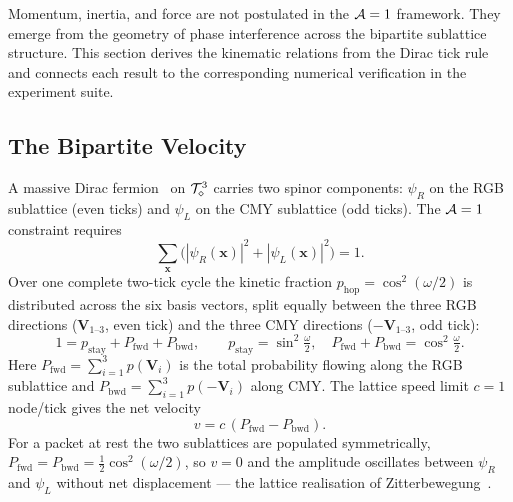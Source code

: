 \label{sec:kinematics}

Momentum, inertia, and force are not postulated in the $\mathcal{A}=1$ framework.
They emerge from the geometry of phase interference across the bipartite
sublattice structure.  This section derives the kinematic relations
from the Dirac tick rule and connects each result to the corresponding
numerical verification in the experiment suite.

\subsection{The Bipartite Velocity}
\label{subsec:bipartite_velocity}

A massive Dirac fermion~\cite{dirac1928} on $\mathcal{T}_\diamond^3$ carries two spinor components:
$\psi_R$ on the RGB sublattice (even ticks) and $\psi_L$ on the CMY
sublattice (odd ticks).  The $\mathcal{A}=1$ constraint requires
\begin{equation}
    \sum_{\mathbf{x}} \bigl(|\psi_R(\mathbf{x})|^2 +
                            |\psi_L(\mathbf{x})|^2\bigr) = 1.
    \label{eq:unity_spinor}
\end{equation}
Over one complete two-tick cycle the kinetic fraction
$p_\mathrm{hop} = \cos^2(\omega/2)$ is distributed across the six
basis vectors, split equally between the three RGB directions
($\mathbf{V}_{1\text{--}3}$, even tick) and the three CMY directions
($-\mathbf{V}_{1\text{--}3}$, odd tick):
\begin{equation}
    1 = p_\mathrm{stay} + P_\mathrm{fwd} + P_\mathrm{bwd},
    \qquad
    p_\mathrm{stay} = \sin^2\!\tfrac{\omega}{2},
    \quad
    P_\mathrm{fwd} + P_\mathrm{bwd} = \cos^2\!\tfrac{\omega}{2}.
    \label{eq:probability_partition}
\end{equation}
Here $P_\mathrm{fwd} = \sum_{i=1}^{3} p(\mathbf{V}_i)$ is the total
probability flowing along the RGB sublattice and
$P_\mathrm{bwd} = \sum_{i=1}^{3} p(-\mathbf{V}_i)$ along CMY.
The lattice speed limit $c = 1$ node/tick gives the net velocity
\begin{equation}
    v = c\,(P_\mathrm{fwd} - P_\mathrm{bwd}).
    \label{eq:velocity}
\end{equation}
For a packet at rest the two sublattices are populated symmetrically,
$P_\mathrm{fwd} = P_\mathrm{bwd} = \tfrac{1}{2}\cos^2(\omega/2)$,
so $v = 0$ and the amplitude oscillates between $\psi_R$ and $\psi_L$
without net displacement — the lattice realisation of Zitterbewegung~\cite{schrodinger1930}.

